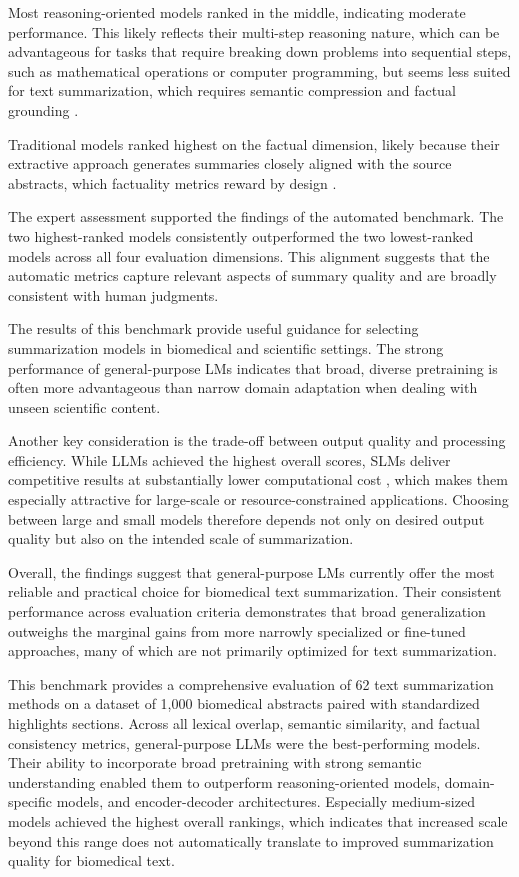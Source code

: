 Most reasoning-oriented models ranked in the middle, indicating moderate performance. This likely reflects their multi-step reasoning nature, which can be advantageous for tasks that require breaking down problems into sequential steps, such as mathematical operations or computer programming, but seems less suited for text summarization, which requires semantic compression and factual grounding \cite{jin2025reasoningnotcomprehensiveevaluation}.

Traditional models ranked highest on the factual dimension, likely because their extractive approach generates summaries closely aligned with the source abstracts, which factuality metrics reward by design \cite{durmus-etal-2020-feqa}.

The expert assessment supported the findings of the automated benchmark. The two highest-ranked models consistently outperformed the two lowest-ranked models across all four evaluation dimensions. This alignment suggests that the automatic metrics capture relevant aspects of summary quality and are broadly consistent with human judgments. 

The results of this benchmark provide useful guidance for selecting summarization models in biomedical and scientific settings. The strong performance of general-purpose \acp{LM} indicates that broad, diverse pretraining is often more advantageous than narrow domain adaptation when dealing with unseen scientific content.

Another key consideration is the trade-off between output quality and processing efficiency. While \acp{LLM} achieved the highest overall scores, \acp{SLM} deliver competitive results at substantially lower computational cost \cite{irugalbandara2024scalingscaleupcostbenefit}, which makes them especially attractive for large-scale or resource-constrained applications. Choosing between large and small models therefore depends not only on desired output quality but also on the intended scale of summarization.

Overall, the findings suggest that general-purpose \acp{LM} currently offer the most reliable and practical choice for biomedical text summarization. Their consistent performance across evaluation criteria demonstrates that broad generalization outweighs the marginal gains from more narrowly specialized or fine-tuned approaches, many of which are not primarily optimized for text summarization.

This benchmark provides a comprehensive evaluation of 62 text summarization methods on a dataset of 1,000 biomedical abstracts paired with standardized highlights sections. Across all lexical overlap, semantic similarity, and factual consistency metrics, general-purpose \acp{LLM} were the best-performing models. Their ability to incorporate broad pretraining with strong semantic understanding enabled them to outperform reasoning-oriented models, domain-specific models, and encoder-decoder architectures. Especially medium-sized models achieved the highest overall rankings, which indicates that increased scale beyond this range does not automatically translate to improved summarization quality for biomedical text.

